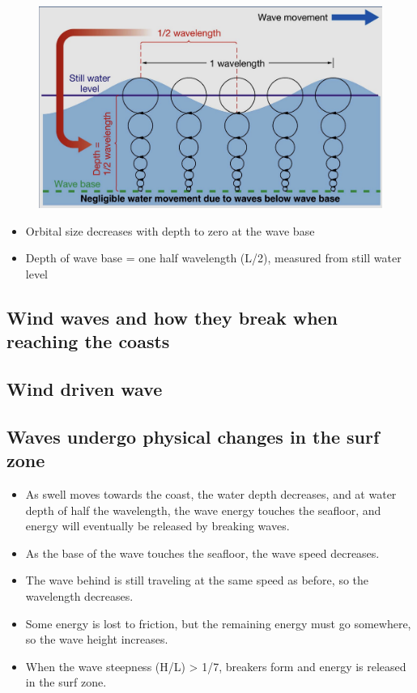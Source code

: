 \begin{figure}[H]
    \centering
    \includegraphics[width=0.9\linewidth]{img/wave_characteristics2.png}
\end{figure}

\begin{itemize}
    \item Orbital size decreases with depth to zero at the wave base
    \item Depth of wave base = one half wavelength (L/2), measured
        from still water level
\end{itemize}

\subsection{Wind waves and how they break when reaching the coasts}

\subsection{Wind driven wave}

\subsection{Waves undergo physical changes in the surf zone}

\begin{itemize}
    \item As swell moves towards the coast, the water depth decreases,
        and at water depth of half the wavelength, the wave energy touches
        the seafloor, and energy will eventually be released by breaking waves.
    \item As the base of the wave touches the seafloor, the wave speed decreases.
    \item The wave behind is still traveling at the same speed as before,
        so the wavelength decreases.
    \item Some energy is lost to friction, but the remaining energy must go somewhere,
        so the wave height increases.
    \item When the wave steepness (H/L) > 1/7, breakers form and energy is released in the
        surf zone.
\end{itemize}

